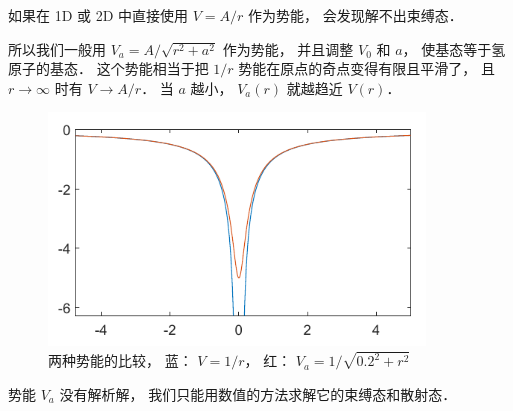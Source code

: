 

如果在 1D 或 2D 中直接使用 $V = A/r$ 作为势能， 会发现解不出束缚态．

所以我们一般用 $V_a = A/\sqrt{r^2 + a^2}$ 作为势能， 并且调整 $V_0$ 和 $a$， 使基态等于氢原子的基态． 这个势能相当于把 $1/r$ 势能在原点的奇点变得有限且平滑了， 且 $r\to\infty$ 时有 $V \to A/r$． 当 $a$ 越小， $V_a(r)$ 就越趋近 $V(r)$．

\begin{figure}[ht]
\centering
\includegraphics[width=10cm]{./figures/Hy1D2D_1.pdf}
\caption{两种势能的比较， 蓝： $V = 1/r$， 红： $V_a = 1/\sqrt{0.2^2 + r^2}$} \label{Hy1D2D_fig1}
\end{figure}

势能 $V_a$ 没有解析解， 我们只能用数值的方法求解它的束缚态和散射态．
